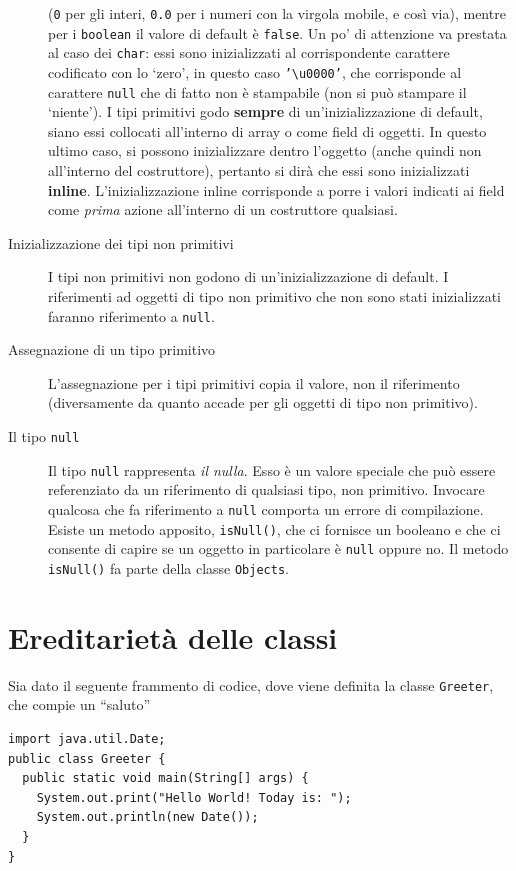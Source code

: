 \documentclass[\fontsizeclass,twocolumn]{\classname}
\theoremstyle{definition}
\theoremstyle{definition}
\begin{document}
\begin{description}
    (\texttt{0} per gli interi, \texttt{0.0} per i numeri con la virgola
    mobile, e così via), mentre per i \texttt{boolean} il valore di default è
    \texttt{false}. Un po' di attenzione va prestata al caso dei \texttt{char}:
    essi sono inizializzati al corrispondente carattere codificato con lo
    `zero', in questo caso \texttt{'\textbackslash u0000'}, che corrisponde al
    carattere \texttt{null} che di fatto non è stampabile (non si può stampare
    il `niente'). I tipi primitivi godo \textbf{sempre} di un'inizializzazione
    di default, siano essi collocati all'interno di array o come field di
    oggetti. In questo ultimo caso, si possono inizializzare dentro l'oggetto
    (anche quindi non all'interno del costruttore), pertanto si dirà che essi
    sono inizializzati \textbf{inline}. L'inizializzazione inline corrisponde a
    porre i valori indicati ai field come \emph{prima} azione all'interno di un
    costruttore qualsiasi.
\item[Inizializzazione dei tipi non primitivi] I tipi non primitivi non godono
    di un'inizializzazione di default. I riferimenti ad oggetti di tipo non
    primitivo che non sono stati inizializzati faranno riferimento a
    \texttt{null}.
\item[Assegnazione di un tipo primitivo] L'assegnazione per i tipi primitivi
    copia il valore, non il riferimento (diversamente da quanto accade per gli
    oggetti di tipo non primitivo).
\item[Il tipo \texttt{null}] Il tipo \texttt{null} rappresenta \emph{il nulla}.
    Esso è un valore speciale che può essere referenziato da un riferimento di
    qualsiasi tipo, non primitivo. Invocare qualcosa che fa riferimento a
    \texttt{null} comporta un errore di compilazione. Esiste un metodo
    apposito, \texttt{isNull()}, che ci fornisce un booleano e che ci consente
    di capire se un oggetto in particolare è \texttt{null} oppure no. Il metodo
    \texttt{isNull()} fa parte della classe \texttt{Objects}.
\end{description}


\chapter{Ereditarietà delle classi}

Sia dato il seguente frammento di codice, dove viene definita la
classe \texttt{Greeter}, che compie un ``saluto''

\begin{lstlisting}
import java.util.Date;
public class Greeter {
  public static void main(String[] args) {
    System.out.print("Hello World! Today is: ");
    System.out.println(new Date());
  }
}
\end{lstlisting}
\end{document}
